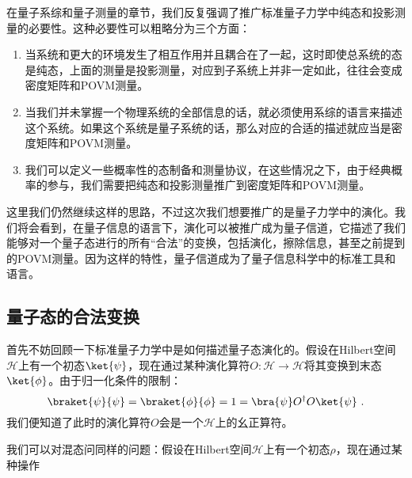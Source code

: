 

在量子系综和量子测量的章节，我们反复强调了推广标准量子力学中纯态和投影测量的必要性。这种必要性可以粗略分为三个方面：
\begin{enumerate}
\item 当系统和更大的环境发生了相互作用并且耦合在了一起，这时即使总系统的态是纯态，上面的测量是投影测量，对应到子系统上并非一定如此，往往会变成密度矩阵和POVM测量。
\item 当我们并未掌握一个物理系统的全部信息的话，就必须使用系综的语言来描述这个系统。如果这个系统是量子系统的话，那么对应的合适的描述就应当是密度矩阵和POVM测量。
\item 我们可以定义一些概率性的态制备和测量协议，在这些情况之下，由于经典概率的参与，我们需要把纯态和投影测量推广到密度矩阵和POVM测量。
\end{enumerate}

这里我们仍然继续这样的思路，不过这次我们想要推广的是量子力学中的演化。我们将会看到，在量子信息的语言下，演化可以被推广成为量子信道，它描述了我们能够对一个量子态进行的所有“合法”的变换，包括演化，擦除信息，甚至之前提到的POVM测量。因为这样的特性，量子信道成为了量子信息科学中的标准工具和语言。

\subsection{量子态的合法变换}

首先不妨回顾一下标准量子力学中是如何描述量子态演化的。假设在Hilbert空间$\mathcal{H}$上有一个初态$\ket{\psi}$，现在通过某种演化算符$O:\mathcal{H}\to\mathcal{H}$将其变换到末态$\ket{\phi}$。由于归一化条件的限制：
\begin{equation}
\braket{\psi}{\psi}=\braket{\phi}{\phi}=1=\bra{\psi}O^\dagger O\ket{\psi}~.
\end{equation}
我们便知道了此时的演化算符$O$会是一个$\mathcal{H}$上的幺正算符。

我们可以对混态问同样的问题：假设在Hilbert空间$\mathcal{H}$上有一个初态$\rho$，现在通过某种操作
